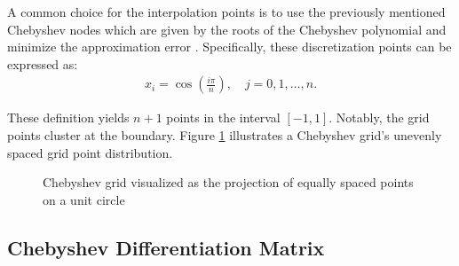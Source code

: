A common choice for the interpolation points is to use the previously mentioned
Chebyshev nodes which are given by the roots of the Chebyshev polynomial and
minimize the approximation error \citep{boyd2001}. Specifically, these
discretization points can be expressed as:
\begin{align}
x_i = \cos(\frac{i \pi}{n}), \quad j=0, 1,\dots,n.
\label{eq:cheb_nodes1d}
\end{align}

These definition yields $n+1$ points in the interval $[-1, 1]$. Notably, the
grid points cluster at the boundary. Figure \ref{fig:cheb_grid1d} illustrates a
Chebyshev grid's unevenly spaced grid point distribution.

\begin{figure}[ht]
  \centering


  \caption{Chebyshev grid visualized as the projection of equally spaced
    points on a unit circle}
  \label{fig:cheb_grid1d}
\end{figure}

\subsection{Chebyshev Differentiation Matrix}


